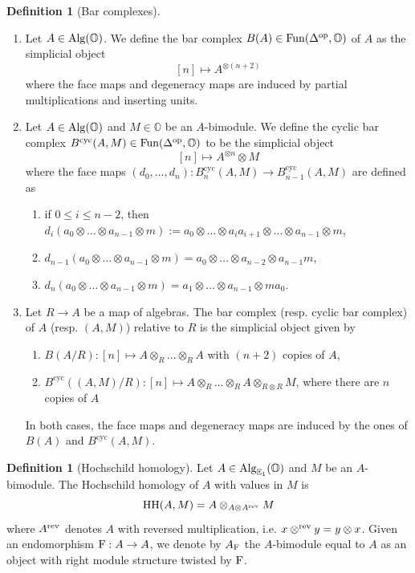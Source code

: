 \documentclass[a4paper, 10pt, oneside, reqno]{amsart}
\theoremstyle{plain}
\theoremstyle{definition}
\newtheorem{defi}[thm]{Definition}
\theoremstyle{remark}
\newcommand{\opp}{\mathrm{op}}
\newcommand{\HHH}{\mathrm{HH}}
\newcommand{\E}{\mathbb{E}}
\newcommand{\Obb}{\mathbb{O}}
\newcommand{\cyc}{\mathrm{cyc}}
\begin{document}
\begin{defi}[Bar complexes] 
\begin{enumerate}
\item Let $A \in \Alg(\Obb)$. We define the bar complex $B(A) \in \Fun(\Delta^{\opp}, \Obb)$ of $A$ as the simplicial object 
$$[n] \mapsto A^{\otimes (n+2)}$$
where the face maps and degeneracy maps are induced by partial multiplications and inserting units.
\item Let $A \in \Alg(\Obb)$ and $M \in \Obb$ be an $A$-bimodule. We define the cyclic bar complex $B^{\cyc}(A,M) \in \Fun(\Delta^{\opp}, \Obb)$ to be the simplicial object 
$$[n] \mapsto A^{\otimes n} \otimes M$$
where the face maps $(d_0, \dots, d_n) : B^{\cyc}_n(A,M) \to B^{\cyc}_{n-1}(A,M)$ are defined as 
\begin{enumerate}
\item if $0 \leq i \leq n-2$, then $d_i(a_0 \otimes \dots \otimes a_{n-1} \otimes m) := a_0 \otimes \dots \otimes a_ia_{i+1} \otimes \dots \otimes a_{n-1} \otimes m$, 
\item $d_{n-1}(a_0 \otimes \dots \otimes a_{n-1} \otimes m) = a_0 \otimes \dots \otimes a_{n-2} \otimes a_{n-1}m$,
\item $d_{n}(a_0 \otimes \dots \otimes a_{n-1} \otimes m) = a_1 \otimes \dots \otimes a_{n-1} \otimes ma_0$.
\end{enumerate}
\item Let $R \to A$ be a map of algebras. The bar complex (resp. cyclic bar complex) of $A$ (resp. $(A,M)$) relative to $R$ is the simplicial object given by 
\begin{enumerate}
\item $B(A/R) : [n] \mapsto A \otimes_R \dots \otimes_R A$ with $(n+2)$ copies of $A$, 
\item $B^{\cyc}((A,M)/R) : [n] \mapsto A \otimes_{R} \dots \otimes_R A \otimes_{R \otimes R} M$, where there are $n$ copies of $A$
\end{enumerate}
In both cases, the face maps and degeneracy maps are induced by the ones of $B(A)$ and $B^{\cyc}(A,M)$. 
\end{enumerate}
\end{defi}

\begin{defi}[Hochschild homology] 
Let $A \in \Alg_{\E_1}(\Obb)$ and $M$ be an $A$-bimodule. The Hochschild homology of $A$ with values in $M$ is 
$$\HHH(A,M) = A \otimes_{A \otimes A^{\rev}} M$$
where $A^{\mathrm{rev}}$ denotes $A$ with reversed multiplication, i.e. $x \otimes^{\mathrm{rev}}y = y \otimes x$. 
Given an endomorphism $\mathrm{F} : A \to A$, we denote by $A_{\mathrm{F}}$ the $A$-bimodule equal to $A$ as an object with right module structure twisted by $\mathrm{F}$. 
\end{defi}
\end{document}
